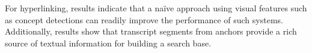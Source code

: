 \documentclass{../acm_proc_article-me11_tweaked}
\begin{document}
For hyperlinking, results indicate that a naïve approach using visual features 
such as concept detections can readily improve the performance of such 
systems. Additionally, results show that transcript segments from anchors 
provide a rich source of textual information for building a search base.



\end{document}
